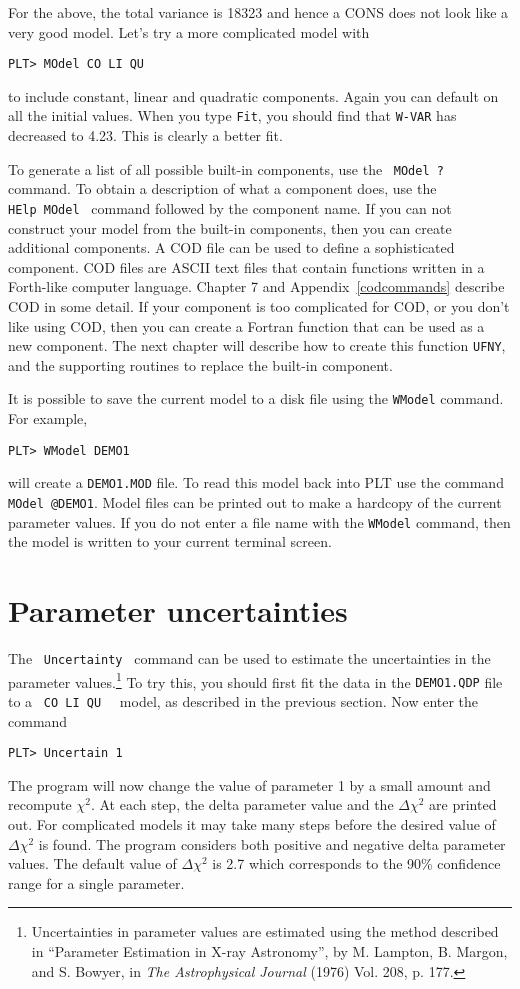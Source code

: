 For the above, the total variance is 18323 and hence a CONS does not
look like a very good model.  Let's try a more complicated model with
\begin{verbatim}
PLT> MOdel CO LI QU
\end{verbatim}
to include constant, linear and quadratic components.
Again you can default on all the initial values.
When you type {\tt Fit},
you should find that {\tt W-VAR} has decreased to 4.23.
This is clearly a better fit.

To generate a list of all possible built-in components,
use the \, {\tt MOdel~?} \, command.
To obtain a description of what a component does,
use the \, {\tt HElp~MOdel} \, command followed by the component name.
If you can not construct your model from the built-in components,
then you can create additional components.
A COD file can be used to define a sophisticated component.
COD files are ASCII text files that contain functions
written in a Forth-like computer language.
Chapter 7 and Appendix~\ref{codcommands} describe COD in some detail.
If your component is too complicated for COD,
or you don't like using COD,
then you can create a Fortran function that can be used as a new component.
The next chapter will describe how to create this function {\tt UFNY},
and the supporting routines to replace the built-in \verb@DEMO@
component.

It is possible to save the current model to a disk file
using the {\tt WModel} command.
For example,
\begin{verbatim}
PLT> WModel DEMO1
\end{verbatim}
will create a {\tt DEMO1.MOD} file.
To read this model back into PLT use the command \, {\tt MOdel~@DEMO1}.
Model files can be printed out
to make a hardcopy of the current parameter values.
If you do not enter a file
name with the {\tt WModel} command,
then the model is written to your current terminal screen.

\section{Parameter uncertainties}

The \, {\tt Uncertainty} \, command
can be used to estimate the uncertainties in the parameter values.\footnote
{Uncertainties in parameter values are estimated
using the method described in
``Parameter Estimation in X-ray Astronomy'',
by M. Lampton, B. Margon, and S. Bowyer,
in {\it The Astrophysical Journal} (1976) Vol. 208, p. 177.}
To try this, you should first fit the data in the {\tt DEMO1.QDP} file
to a \, {\tt CO~LI~QU } \, model,
as described in the previous section.
Now enter the command
\begin{verbatim}
PLT> Uncertain 1
\end{verbatim}
The program will now change the value of parameter 1 by a small amount
and recompute $\chi^2$.
At each step,
the delta parameter value and the $\Delta$$\chi^2$ are printed out.
For complicated models it may take many steps
before the desired value of $\Delta$$\chi^2$ is found.
The program considers both positive and negative delta parameter values.
The default value of $\Delta$$\chi^2$ is 2.7
which corresponds to the 90\% confidence range for a single parameter.

